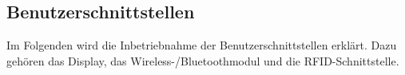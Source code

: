 
\subsection{Benutzerschnittstellen}
\label{sec:Inbetriebnahme_Benutzerschnittstellen}

Im Folgenden wird die Inbetriebnahme der Benutzerschnittstellen erklärt. Dazu gehören das Display, das Wireless-/Bluetoothmodul und die RFID-Schnittstelle.